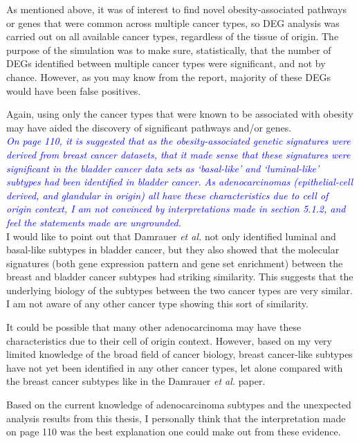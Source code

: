 \documentclass[a4paper, 12pt]{article}
\begin{document}
\noindent
As mentioned above, it was of interest to find novel obesity-associated pathways or genes that were common across multiple cancer types, so DEG analysis was carried out on all available cancer types, regardless of the tissue of origin.
The purpose of the simulation was to make sure, statistically, that the number of DEGs identified between multiple cancer types were significant, and not by chance.
However, as you may know from the report, majority of these DEGs would have been false positives.

Again, using only the cancer types that were known to be associated with obesity may have aided the discovery of significant pathways and/or genes.
\\

\noindent
\textcolor{blue}{
\textit{On page 110, it is suggested that as the obesity-associated genetic signatures were derived from breast cancer datasets, that it made sense that these signatures were significant in the bladder cancer data sets as `basal-like' and `luminal-like' subtypes had been identified in bladder cancer.
As adenocarcinomas (epithelial-cell derived, and glandular in origin) all have these characteristics due to cell of origin context, I am not convinced by interpretations made in section 5.1.2, and feel the statements made are ungrounded.
}
}\\

\noindent
I would like to point out that Damrauer \textit{et al.} not only identified luminal and basal-like subtypes in bladder cancer, but they also showed that the molecular signatures (both gene expression pattern and gene set enrichment) between the breast and bladder cancer subtypes had striking similarity.
This suggests that the underlying biology of the subtypes between the two cancer types are very similar.
I am not aware of any other cancer type showing this sort of similarity.

It could be possible that many other adenocarcinoma may have these characteristics due to their cell of origin context.
However, based  on my very limited knowledge of the broad field of cancer biology, breast cancer-like subtypes  have not yet been identified in any other cancer types, let alone compared with the breast cancer subtypes like in the Damrauer \textit{et al.} paper.

Based on the current knowledge of adenocarcinoma subtypes and the unexpected analysis results from this thesis, I personally think that the interpretation made on page 110  was the best explanation one could make out from these evidence.
\\
\end{document}
